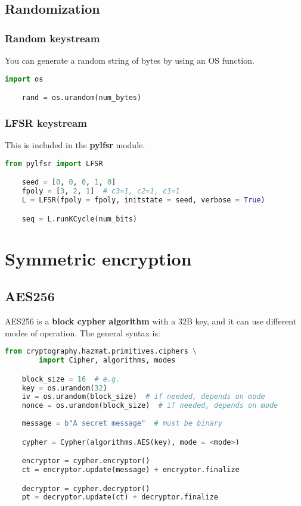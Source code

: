 \documentclass[a4paper, 12 pt]{memoir}
\begin{document}
\section{Randomization}
\subsection{Random keystream}
You can generate a random string of bytes by using an OS function.

\begin{lstlisting}[language=Python]
    import os

    rand = os.urandom(num_bytes)
\end{lstlisting}

\subsection{LFSR keystream}
This is included in the \textbf{pylfsr} module.
\begin{lstlisting}[language=Python]
    from pylfsr import LFSR

    seed = [0, 0, 0, 1, 0]
    fpoly = [3, 2, 1]  # c3=1, c2=1, c1=1
    L = LFSR(fpoly = fpoly, initstate = seed, verbose = True)

    seq = L.runKCycle(num_bits)
\end{lstlisting}


\chapter{Symmetric encryption}

\section{AES256}
AES256 is a \textbf{block cypher algorithm} with a 32B key, and it can use different modes of operation. The general syntax is:

\begin{lstlisting}[language=Python]
    from cryptography.hazmat.primitives.ciphers \
        import Cipher, algorithms, modes

    block_size = 16  # e.g.
    key = os.urandom(32)
    iv = os.urandom(block_size)  # if needed, depends on mode
    nonce = os.urandom(block_size)  # if needed, depends on mode
    
    message = b"A secret message"  # must be binary

    cypher = Cypher(algorithms.AES(key), mode = <mode>)

    encryptor = cypher.encryptor()
    ct = encryptor.update(message) + encryptor.finalize

    decryptor = cypher.decryptor()
    pt = decryptor.update(ct) + decryptor.finalize
\end{lstlisting}
\end{document}
